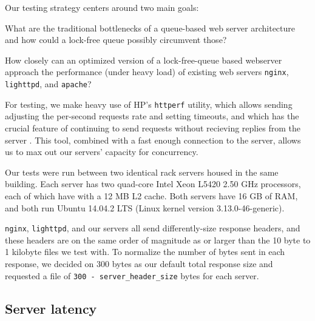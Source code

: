 \documentclass[twoside,10pt]{article}
\begin{document}
\begin{multicols}{2}
Our testing strategy centers around two main goals:

\begin{compactitem}
\item What are the traditional bottlenecks of a queue-based web server
  architecture and how could a lock-free queue possibly circumvent
  those?
\item How closely can an optimized version of a lock-free-queue based
  webserver approach the performance (under heavy load) of existing
  web servers \verb+nginx+, \verb+lighttpd+, and \verb+apache+?
\end{compactitem}

For testing, we make heavy use of HP's \verb+httperf+ utility, which
allows sending adjusting the per-second requests rate and setting
timeouts, and which has the crucial feature of continuing to send
requests without recieving replies from the server
\cite{mosberger1998httperf}. This tool, combined with a fast enough
connection to the server, allows us to max out our servers' capacity
for concurrency.

Our tests were run between two identical rack servers housed in the
same building. Each server has two quad-core Intel Xeon L5420 2.50 GHz
processors, each of which have with a 12 MB L2 cache. Both servers
have 16 GB of RAM, and both run Ubuntu 14.04.2 LTS (Linux kernel version
3.13.0-46-generic).

\verb+nginx+, \verb+lighttpd+, and our servers all send
differently-size response headers, and these headers are on the same
order of magnitude as or larger than the 10 byte to 1 kilobyte files
we test with. To normalize the number of bytes sent in each response,
we decided on 300 bytes as our default total response size and
requested a file of \verb+300 - server_header_size+ bytes for each
server.

\subsection{Server latency}


\end{multicols}
\end{document}
